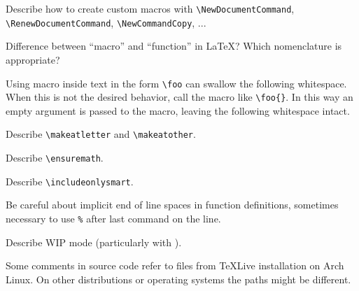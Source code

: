 \begin{Todo}
    Describe how to create custom macros with \verb|\NewDocumentCommand|, \verb|\RenewDocumentCommand|, \verb|\NewCommandCopy|, ...
\end{Todo}
\begin{Question}
    Difference between \enquote{macro} and \enquote{function} in \LaTeX{}?
    Which nomenclature is appropriate?
\end{Question}
\begin{remark}
    Using macro inside text in the form \verb|\foo| can swallow the following whitespace.
    When this is not the desired behavior, call the macro like \verb|\foo{}|.
    In this way an empty argument is passed to the macro, leaving the following whitespace intact.
\end{remark}
\begin{Todo}
    Describe \verb|\makeatletter| and \verb|\makeatother|.
\end{Todo}
\begin{Todo}
    Describe \verb|\ensuremath|.
\end{Todo}
\begin{Todo}
    Describe \verb|\includeonlysmart|.
\end{Todo}
\begin{Note}
    Be careful about implicit end of line spaces in function definitions, sometimes necessary to use \texttt{\%} after last command on the line.
\end{Note}
\begin{Todo}
    Describe WIP mode (particularly with ).
\end{Todo}
\begin{Note}
    Some comments in source code refer to files from \TeX{}Live installation on Arch Linux.
    On other distributions or operating systems the paths might be different.
\end{Note}
